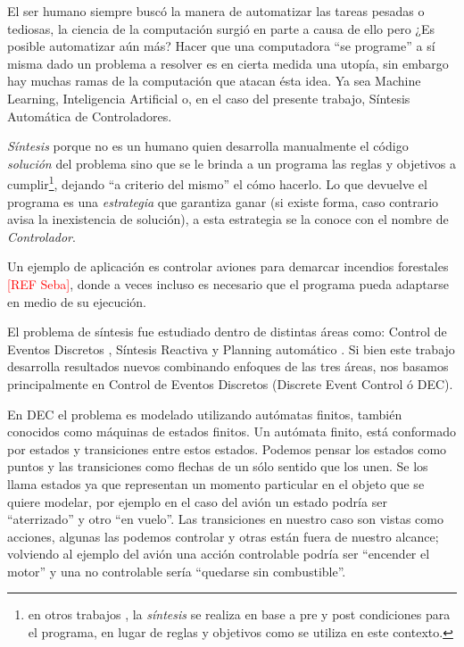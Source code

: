 
El ser humano siempre buscó la manera de automatizar las tareas pesadas o tediosas, la ciencia de la computación surgió en parte a causa de ello pero ¿Es posible automatizar aún más? 
Hacer que una computadora ``se programe'' a sí misma dado un problema a resolver es en cierta medida una utopía, sin embargo hay muchas ramas de la computación que atacan ésta idea. Ya sea Machine Learning, Inteligencia Artificial o, en el caso del presente trabajo, Síntesis Automática de Controladores.

\textit{Síntesis} porque no es un humano quien desarrolla manualmente el código \textit{solución} del problema sino que se le brinda a un programa las reglas y objetivos a cumplir\footnote{en otros trabajos \cite{}, la \textit{síntesis} se realiza en base a pre y post condiciones para el programa, en lugar de reglas y objetivos como se utiliza en este contexto.}, dejando ``a criterio del mismo'' el cómo hacerlo. Lo que devuelve el programa es una \textit{estrategia} que garantiza ganar (si existe forma, caso contrario avisa la inexistencia de solución), a esta estrategia se la conoce con el nombre de \textit{Controlador}.

Un ejemplo de aplicación es controlar aviones para demarcar incendios forestales \textcolor{red}{[REF Seba]}, donde a veces incluso es necesario que el programa pueda adaptarse en medio de su ejecución.

El problema de síntesis fue estudiado dentro de distintas áreas como: Control de Eventos Discretos \cite{Ramadge:1987:SC}, Síntesis Reactiva \cite{Pnueli:1989:RS} y Planning automático \cite{Nau:2004:AP}. 
Si bien este trabajo desarrolla resultados nuevos combinando enfoques de las tres áreas, nos basamos principalmente en Control de Eventos Discretos (Discrete Event Control ó DEC).

 En DEC el problema es modelado utilizando autómatas finitos, también conocidos como máquinas de estados finitos. 
Un autómata finito, está conformado por estados y transiciones entre estos estados. Podemos pensar los estados como puntos y las transiciones como flechas de un sólo sentido que los unen. Se los llama estados ya que representan un momento particular en el objeto que se quiere modelar, por ejemplo en el caso del avión un estado podría ser ``aterrizado'' y otro ``en vuelo''. Las transiciones en nuestro caso son vistas como acciones, algunas las podemos controlar y otras están fuera de nuestro alcance; volviendo al ejemplo del avión una acción controlable podría ser ``encender el motor'' y una no controlable sería ``quedarse sin combustible''.

